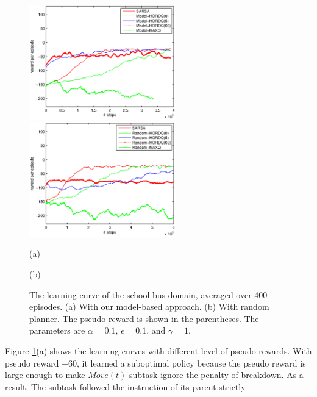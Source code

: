 \documentclass{article} %
\begin{document}

\begin{figure}[t]
 \begin{minipage}[b]{0.5\linewidth}
    \includegraphics[width=2.5in] {Approx.eps}
\end{minipage}
\begin{minipage}[b]{0.5\linewidth}
    \includegraphics[width=2.5in] {Random.eps}
\end{minipage}
\begin{minipage}[b]{0.5\linewidth} \centering (a) \end{minipage}
\begin{minipage}[b]{0.5\linewidth} \centering (b) \end{minipage}

\caption{The learning curve of the school bus domain, averaged over 400 episodes. (a) With our model-based approach. (b) With random planner.
The pseudo-reward is shown in the parentheses. The parameters are $\alpha=0.1$, $\epsilon=0.1$, and $\gamma=1$.
}
\label{fig:res}
\end{figure}

Figure \ref{fig:res}(a) shows the learning curves with different level of pseudo rewards.
With pseudo reward +60, it learned a suboptimal policy because
the pseudo reward is large enough to make $Move(t)$ subtask ignore 
the penalty of breakdown. As a result, The subtask followed 
the instruction of its parent strictly.
\end{document}
